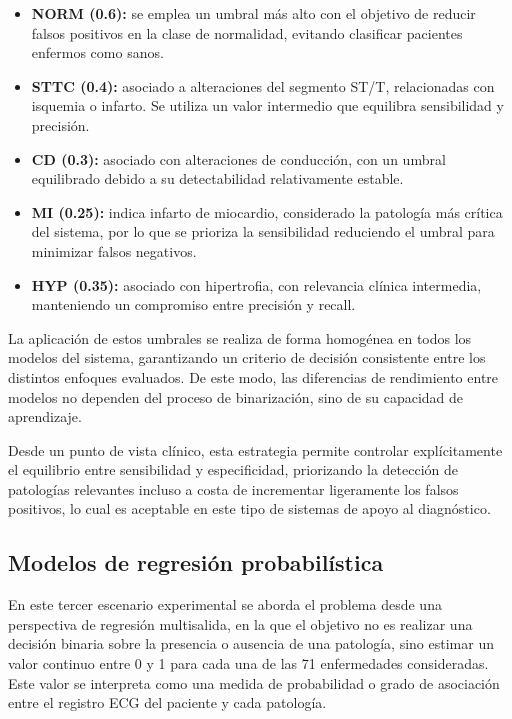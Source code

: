 \documentclass[12pt,a4paper,twoside]{book}
\begin{document}
\begin{itemize}
	\item \textbf{NORM (0.6):} se emplea un umbral más alto con el objetivo de reducir falsos positivos en la clase de normalidad, evitando clasificar pacientes enfermos como sanos.
	\item \textbf{STTC (0.4):} asociado a alteraciones del segmento ST/T, relacionadas con isquemia o infarto. Se utiliza un valor intermedio que equilibra sensibilidad y precisión.
	\item \textbf{CD (0.3):} asociado con alteraciones de conducción, con un umbral equilibrado debido a su detectabilidad relativamente estable.
	\item \textbf{MI (0.25):} indica infarto de miocardio, considerado la patología más crítica del sistema, por lo que se prioriza la sensibilidad reduciendo el umbral para minimizar falsos negativos.
	\item \textbf{HYP (0.35):} asociado con hipertrofia, con relevancia clínica intermedia, manteniendo un compromiso entre precisión y recall.
\end{itemize}

La aplicación de estos umbrales se realiza de forma homogénea en todos los modelos del sistema, garantizando un criterio de decisión consistente entre los distintos enfoques evaluados. 
De este modo, las diferencias de rendimiento entre modelos no dependen del proceso de binarización, sino de su capacidad de aprendizaje.

Desde un punto de vista clínico, esta estrategia permite controlar explícitamente el equilibrio entre sensibilidad y especificidad, priorizando la detección de patologías relevantes incluso a costa de incrementar ligeramente los falsos positivos, lo cual es aceptable en este tipo de sistemas de apoyo al diagnóstico.

\subsection{Modelos de regresión probabilística}

En este tercer escenario experimental se aborda el problema desde una perspectiva de regresión multisalida, en la que el objetivo no es realizar una decisión binaria sobre la presencia o ausencia de una patología, sino estimar un valor continuo entre 0 y 1 para cada una de las 71 enfermedades consideradas. 
Este valor se interpreta como una medida de probabilidad o grado de asociación entre el registro ECG del paciente y cada patología.
\end{document}

